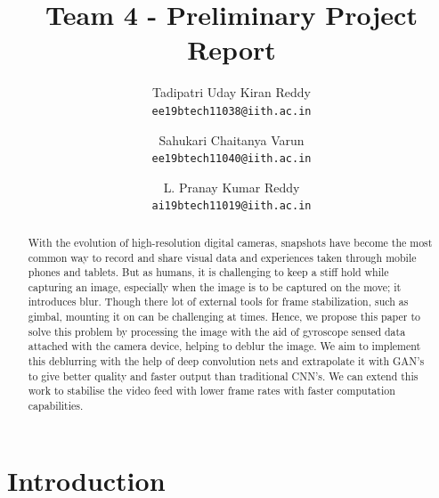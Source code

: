 \documentclass[10pt,twocolumn,letterpaper]{article}
\begin{document}
\title{Team 4 - Preliminary Project Report}

\author{Tadipatri Uday Kiran Reddy\\
{\tt\small ee19btech11038@iith.ac.in}
\and
Sahukari Chaitanya Varun\\
{\tt\small ee19btech11040@iith.ac.in}
\and
L. Pranay Kumar Reddy\\
{\tt\small ai19btech11019@iith.ac.in}
}
\maketitle

\begin{abstract}
With the evolution of high-resolution digital cameras, snapshots have become the most common way to record and share visual data and experiences taken through mobile phones and tablets. But as humans, it is challenging to keep a stiff hold while capturing an image, especially when the image is to be captured on the move; it introduces blur. Though there lot of external tools for frame stabilization, such as gimbal, mounting it on can be challenging at times. Hence, we propose this paper to solve this problem by processing the image with the aid of gyroscope sensed data  attached with the camera device, helping to deblur the image. We aim to implement this deblurring with the help of deep convolution nets and extrapolate it with GAN's to give better quality and faster output than  traditional CNN's. We can extend this work to stabilise the video feed with lower frame rates with faster computation capabilities.
\end{abstract}

\section{Introduction}
\label{sec:intro}
\end{document}
